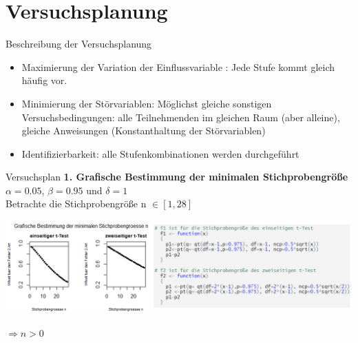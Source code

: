 \documentclass[ ngerman, fontsize= 10pt, headings=big, titlepage=true, xcolor=dvipsnames]{beamer}
\begin{document}
\section{Versuchsplanung}
\begin{frame}{Beschreibung der Versuchsplanung}
\begin{itemize}
\item Maximierung der Variation  der Einflussvariable : Jede Stufe kommt gleich häufig vor.\\
\item Minimierung der Störvariablen: Möglichst gleiche sonstigen Versuchsbedingungen: alle Teilnehmenden im gleichen Raum (aber alleine), gleiche Anweisungen	(Konstanthaltung der Störvariablen)
\item Identifizierbarkeit: alle Stufenkombinationen werden durchgeführt
\end{itemize}
\end{frame}

\begin{frame}[fragile]{Versuchsplan}
	\textbf{1. Grafische Bestimmung der minimalen Stichprobengröße}\\
	$\alpha =0.05$, $\beta = 0.95$ und $\delta =1$\\
	 Betrachte die Stichprobengröße n $\in [1,28]$
	 

	\includegraphics[scale=0.4]{Stichprobengröße.png}
 


	$\Rightarrow n > 0$
\end{frame}
\end{document}
